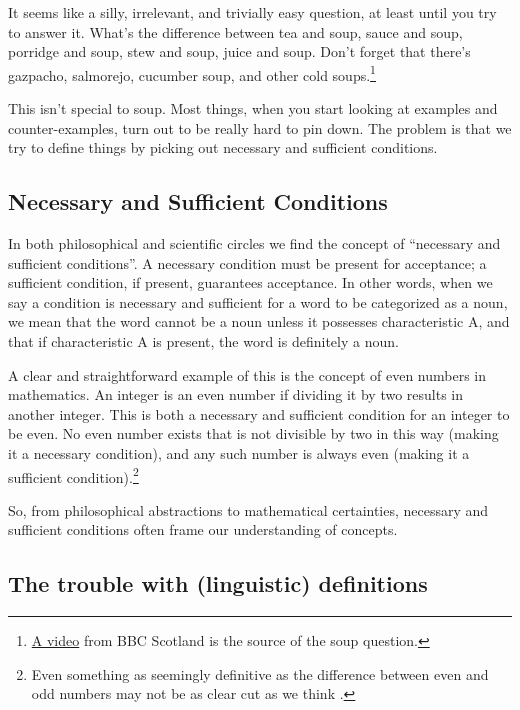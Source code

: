 It seems like a silly, irrelevant, and trivially easy question, at least until you try to answer it. What's the difference between tea and soup, sauce and soup, porridge and soup, stew and soup, juice and soup. Don't forget that there's gazpacho, salmorejo, cucumber soup, and other cold soups.\footnote{\href{https://youtu.be/Y1HVTNxwt7w}{A video} from BBC Scotland is the source of the soup question.}

This isn't special to soup. Most things, when you start looking at examples and counter-examples, turn out to be really hard to pin down. The problem is that we try to define things by picking out necessary and sufficient conditions.

\subsection{Necessary and Sufficient Conditions}\label{sec:conditions}

In both philosophical and scientific circles we find the concept of ``necessary and sufficient conditions''. A necessary condition must be present for acceptance; a sufficient condition, if present, guarantees acceptance. In other words, when we say a condition is necessary and sufficient for a word to be categorized as a noun, we mean that the word cannot be a noun unless it possesses characteristic A, and that if characteristic A is present, the word is definitely a noun.

A clear and straightforward example of this is the concept of even numbers in mathematics. An integer is an even number if dividing it by two results in another integer. This is both a necessary and sufficient condition for an integer to be even. No even number exists that is not divisible by two in this way (making it a necessary condition), and any such number is always even (making it a sufficient condition).\footnote{Even something as seemingly definitive as the difference between even and odd numbers may not be as clear cut as we think \autocite{Heubner2018}.}

So, from philosophical abstractions to mathematical certainties, necessary and sufficient conditions often frame our understanding of concepts.

\subsection{The trouble with (linguistic) definitions}\label{sec:definitions}

